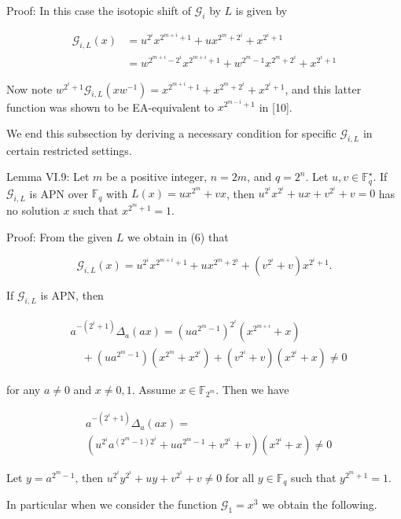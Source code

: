 \documentclass[10pt]{article}
\begin{document}
Proof: In this case the isotopic shift of $\mathcal{G}_{i}$ by $L$ is given by

$$
\begin{aligned}
\mathcal{G}_{i, L}(x) & =u^{2^{i}} x^{2^{m+i}+1}+u x^{2^{m}+2^{i}}+x^{2^{i}+1} \\
& =w^{2^{m+i}-2^{i}} x^{2^{m+i}+1}+w^{2^{m}-1} x^{2^{m}+2^{i}}+x^{2^{i}+1}
\end{aligned}
$$

Now note $w^{2^{i}+1} \mathcal{G}_{i, L}\left(x w^{-1}\right)=x^{2^{m+i}+1}+x^{2^{m}+2^{i}}+x^{2^{i}+1}$, and this latter function was shown to be EA-equivalent to $x^{2^{m-i}+1}$ in [10].

We end this subsection by deriving a necessary condition for specific $\mathcal{G}_{i, L}$ in certain restricted settings.

Lemma VI.9: Let $m$ be a positive integer, $n=2 m$, and $q=2^{n}$. Let $u, v \in \mathbb{F}_{q}^{\star}$. If $\mathcal{G}_{i, L}$ is APN over $\mathbb{F}_{q}$ with $L(x)= u x^{2^{m}}+v x$, then $u^{2^{i}} x^{2^{i}}+u x+v^{2^{i}}+v=0$ has no solution $x$ such that $x^{2^{m}+1}=1$.

Proof: From the given $L$ we obtain in (6) that

$$
\mathcal{G}_{i, L}(x)=u^{2^{i}} x^{2^{m+i}+1}+u x^{2^{m}+2^{i}}+\left(v^{2^{i}}+v\right) x^{2^{i}+1} .
$$

If $\mathcal{G}_{i, L}$ is APN, then

$$
\begin{aligned}
& a^{-\left(2^{i}+1\right)} \Delta_{a}(a x)=\left(u a^{2^{m}-1}\right)^{2^{i}}\left(x^{2^{m+i}}+x\right) \\
& \quad+\left(u a^{2^{m}-1}\right)\left(x^{2^{m}}+x^{2^{i}}\right)+\left(v^{2^{i}}+v\right)\left(x^{2^{i}}+x\right) \neq 0
\end{aligned}
$$

for any $a \neq 0$ and $x \neq 0,1$. Assume $x \in \mathbb{F}_{2^{m}}$. Then we have

$$
\begin{aligned}
& a^{-\left(2^{i}+1\right)} \Delta_{a}(a x)= \\
& \left(u^{2^{i}} a^{\left(2^{m}-1\right) 2^{i}}+u a^{2^{m}-1}+v^{2^{i}}+v\right)\left(x^{2^{i}}+x\right) \neq 0
\end{aligned}
$$

Let $y=a^{2^{m}-1}$, then $u^{2^{i}} y^{2^{i}}+u y+v^{2^{i}}+v \neq 0$ for all $y \in \mathbb{F}_{q}$ such that $y^{2^{m}+1}=1$.

In particular when we consider the function $\mathcal{G}_{1}=x^{3}$ we obtain the following.
\end{document}
